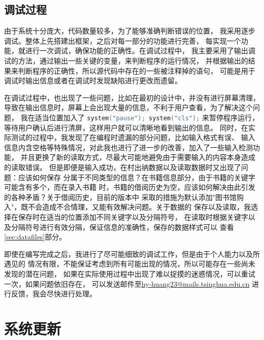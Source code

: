 \documentclass[12pt,twoside]{ctexart}
\begin{document}
\subsection{调试过程}

由于系统十分庞大，代码数量较多，为了能够准确判断错误的位置，
我采用逐步调试。整体上先搭建出框架，之后对每一部分的功能进行完善，
每实现一个功能，就进行一次调试，确保功能的正确性。在调试过程中，
我主要采用了输出调试的方法，通过输出一些关键的变量，来判断程序的运行情况，
并根据输出的结果来判断程序的正确性，所以源代码中存在的一些被注释掉的语句，
可能是用于调试时输出信息或者在调试时发现缺陷进行更改而遗留。
\par
在调试过程中，也出现了一些问题，比如在最初的设计中，并没有进行屏幕清理，
导致在输出信息时，屏幕上会出现大量的信息，不利于用户查看，为了解决这个问题，
我在适当位置加入了
\lstinline[language=C++]{system("pause"); system("cls");}
来暂停程序运行，等待用户确认后进行清屏，这样用户就可以清晰地看到输出的信息。
同时，在实际测试的过程中，我发现了在编程时遗漏的部分问题，比如输入格式有误、
输入信息内含空格等特殊情况，对此我也进行了进一步的改善，加入了一些输入检测功能，
并且更换了新的读取方式，尽最大可能地避免由于需要输入的内容本身造成的读取错误。
但是即便是输入成功，在村出纳数据以及读取数据时又出现了问题：应该如何保存
分属于不同类型的信息？在书籍信息部分，由于书籍的关键字可能含有多个，而在录入书籍
时，书籍的借阅历史为空，应该如何解决由此引发的各种矛盾？关于借阅历史，目前的版本中
采取的措施为默认添加"图书馆购入"，既不会造成不合情理，又能有效解决问题。关于数据的
保存以及读取，我选择在保存时在适当的位置添加不同关键字以及分隔符号，
在读取时根据关键字以及分隔符号进行有效分隔，保证信息的准确性，保存的数据样式可以
查看\ref{sec:datafiles}部分。
\par
即使在编写完成之后，我进行了尽可能细致的调试工作，但是由于个人能力以及所遇见的
情况有限，不能保证考虑到所有可能出现的情况，所以可能存在一些尚未发现的潜在问题，
如果在实际使用过程中出现了难以捉摸的迷惑情况，可以重试一次，如果问题依旧存在，
可以发送邮件至\href{mailto:hy-huang23@mails.tsinghua.edu.cn}{hy-huang23@mails.tsinghua.edu.cn}
进行反馈，我会尽快进行处理。

\newpage
\section{系统更新}
\end{document}
